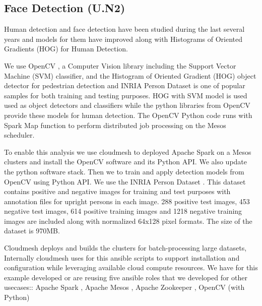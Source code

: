 

\subsection{Face Detection (U.N2)}


Human detection and face detection have been studied during the last
several years and models for them have improved along with Histograms
of Oriented Gradients (HOG) \cite{??} for Human Detection. 



We use OpenCV \cite{??}, a Computer Vision library including the
Support Vector Machine (SVM) classifier, and the Histogram of Oriented
Gradient (HOG) \cite{??}object detector for pedestrian detection and
INRIA Person Dataset is one of popular samples for both training and
testing purposes. HOG with SVM model is used used as object detectors
and classifiers while the python libraries from OpenCV provide these
models for human detection.  The OpenCV Python code runs with Spark
Map function to perform distributed job processing on the Mesos
scheduler.

To enable this analysis we use cloudmesh to deployed Apache Spark on a
Mesos clusters and install the OpenCV software and its Python API. We
also update the python software stack. Then we to train and apply
detection models from OpenCV using Python API. We use the INRIA Person
Dataset \cite{??}. This dataset contains positive and negative images for
training and test purposes with annotation files for upright persons in each
image. 288 positive test images, 453 negative test images, 614 positive
training images and 1218 negative training images are included along with
normalized 64x128 pixel formats. The size of the dataset is 970MB.

Cloudmesh deploys and builds the clusters for batch-processing large
datasets, Internally cloudmesh uses for this ansible scripts to
support installation and configuration while leveraging available
cloud compute resources. We have for this example developed or are
reusing five ansible roles that we developed for other usecases::
Apache Spark \cite{??}, 
Apache Mesos \cite{??}, Apache Zookeeper \cite{??}, 
OpenCV (with Python) \cite{??}  






